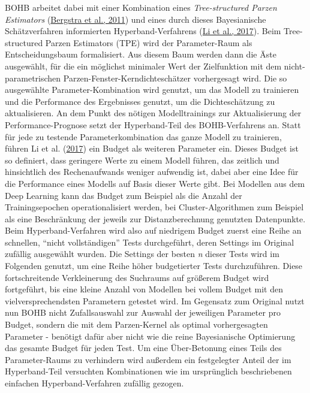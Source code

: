 \documentclass[
  12pt,
  openany]{book}
\begin{document}
BOHB arbeitet dabei mit einer Kombination eines \emph{Tree-structured Parzen Estimators} (\protect\hyperlink{ref-bergstraAlgorithmsHyperParameterOptimization2011}{Bergstra et al., 2011}) und eines durch dieses Bayesianische Schätzverfahren informierten Hyperband-Verfahrens (\protect\hyperlink{ref-liHyperbandBanditbasedConfiguration2017}{Li et al., 2017}). Beim Tree-structured Parzen Estimators (TPE) wird der Parameter-Raum als Entscheidungsbaum formalisiert. Aus diesem Baum werden dann die Äste ausgewählt, für die ein möglichst minimaler Wert der Zielfunktion mit dem nicht-parametrischen Parzen-Fenster-Kerndichteschätzer vorhergesagt wird. Die so ausgewählte Parameter-Kombination wird genutzt, um das Modell zu trainieren und die Performance des Ergebnisses genutzt, um die Dichteschätzung zu aktualisieren. \newline
An dem Punkt des nötigen Modelltrainings zur Aktualisierung der Performance-Prognose setzt der Hyperband-Teil des BOHB-Verfahrens an. Statt für jede zu testende Parameterkombination das ganze Modell zu trainieren, führen Li et al. (\protect\hyperlink{ref-liHyperbandBanditbasedConfiguration2017}{2017}) ein Budget als weiteren Parameter ein. Dieses Budget ist so definiert, dass geringere Werte zu einem Modell führen, das zeitlich und hinsichtlich des Rechenaufwands weniger aufwendig ist, dabei aber eine Idee für die Performance eines Modells auf Basis dieser Werte gibt. Bei Modellen aus dem Deep Learning kann das Budget zum Beispiel als die Anzahl der Trainingsepochen operationalisiert werden, bei Cluster-Algorithmen zum Beispiel als eine Beschränkung der jeweils zur Distanzberechnung genutzten Datenpunkte. Beim Hyperband-Verfahren wird also auf niedrigem Budget zuerst eine Reihe an schnellen, ``nicht vollständigen'' Tests durchgeführt, deren Settings im Original zufällig ausgewählt wurden. Die Settings der besten \emph{n} dieser Tests wird im Folgenden genutzt, um eine Reihe höher budgetierter Tests durchzuführen. Diese fortschreitende Verkleinerung des Suchraums auf größerem Budget wird fortgeführt, bis eine kleine Anzahl von Modellen bei vollem Budget mit den vielversprechendsten Parametern getestet wird.
Im Gegensatz zum Original nutzt nun BOHB nicht Zufallsauswahl zur Auswahl der jeweiligen Parameter pro Budget, sondern die mit dem Parzen-Kernel als optimal vorhergesagten Parameter - benötigt dafür aber nicht wie die reine Bayesianische Optimierung das gesamte Budget für jeden Test.
Um eine Über-Betonung eines Teils des Parameter-Raums zu verhindern wird außerdem ein festgelegter Anteil der im Hyperband-Teil versuchten Kombinationen wie im ursprünglich beschriebenen einfachen Hyperband-Verfahren zufällig gezogen. \newline
\end{document}
